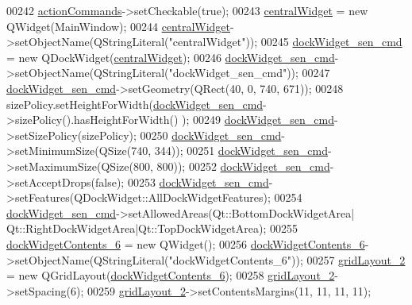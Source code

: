 \begin{DoxyCode}
00242         \hyperlink{a00080_a3dccdc21d3df68b86550093b5e3c0356}{actionCommands}->setCheckable(\textcolor{keyword}{true});
00243         \hyperlink{a00080_a30075506c2116c3ed4ff25e07ae75f81}{centralWidget} = \textcolor{keyword}{new} QWidget(MainWindow);
00244         \hyperlink{a00080_a30075506c2116c3ed4ff25e07ae75f81}{centralWidget}->setObjectName(QStringLiteral(\textcolor{stringliteral}{"centralWidget"}));
00245         \hyperlink{a00080_a9eb86a5ee396766f0f4a65f2d2bd7688}{dockWidget\_sen\_cmd} = \textcolor{keyword}{new} QDockWidget(\hyperlink{a00080_a30075506c2116c3ed4ff25e07ae75f81}{centralWidget});
00246         \hyperlink{a00080_a9eb86a5ee396766f0f4a65f2d2bd7688}{dockWidget\_sen\_cmd}->setObjectName(QStringLiteral(\textcolor{stringliteral}{"dockWidget\_sen\_cmd"}));
00247         \hyperlink{a00080_a9eb86a5ee396766f0f4a65f2d2bd7688}{dockWidget\_sen\_cmd}->setGeometry(QRect(40, 0, 740, 671));
00248         sizePolicy.setHeightForWidth(\hyperlink{a00080_a9eb86a5ee396766f0f4a65f2d2bd7688}{dockWidget\_sen\_cmd}->sizePolicy().hasHeightForWidth()
      );
00249         \hyperlink{a00080_a9eb86a5ee396766f0f4a65f2d2bd7688}{dockWidget\_sen\_cmd}->setSizePolicy(sizePolicy);
00250         \hyperlink{a00080_a9eb86a5ee396766f0f4a65f2d2bd7688}{dockWidget\_sen\_cmd}->setMinimumSize(QSize(740, 344));
00251         \hyperlink{a00080_a9eb86a5ee396766f0f4a65f2d2bd7688}{dockWidget\_sen\_cmd}->setMaximumSize(QSize(800, 800));
00252         \hyperlink{a00080_a9eb86a5ee396766f0f4a65f2d2bd7688}{dockWidget\_sen\_cmd}->setAcceptDrops(\textcolor{keyword}{false});
00253         \hyperlink{a00080_a9eb86a5ee396766f0f4a65f2d2bd7688}{dockWidget\_sen\_cmd}->setFeatures(QDockWidget::AllDockWidgetFeatures);
00254         \hyperlink{a00080_a9eb86a5ee396766f0f4a65f2d2bd7688}{dockWidget\_sen\_cmd}->setAllowedAreas(Qt::BottomDockWidgetArea|
      Qt::RightDockWidgetArea|Qt::TopDockWidgetArea);
00255         \hyperlink{a00080_a23b450a9debad2b0fecc6f063772caf2}{dockWidgetContents\_6} = \textcolor{keyword}{new} QWidget();
00256         \hyperlink{a00080_a23b450a9debad2b0fecc6f063772caf2}{dockWidgetContents\_6}->setObjectName(QStringLiteral(\textcolor{stringliteral}{"dockWidgetContents\_6"}));
00257         \hyperlink{a00080_a6b2a0c5f7e8ff2a87134908dd770d2d2}{gridLayout\_2} = \textcolor{keyword}{new} QGridLayout(\hyperlink{a00080_a23b450a9debad2b0fecc6f063772caf2}{dockWidgetContents\_6});
00258         \hyperlink{a00080_a6b2a0c5f7e8ff2a87134908dd770d2d2}{gridLayout\_2}->setSpacing(6);
00259         \hyperlink{a00080_a6b2a0c5f7e8ff2a87134908dd770d2d2}{gridLayout\_2}->setContentsMargins(11, 11, 11, 11);

\end{DoxyCode}
